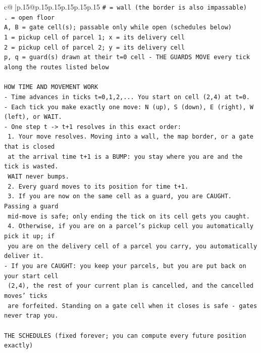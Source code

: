\documentclass{article}
\begin{document}
{\begin{supertabular}{c@{$\;$}|p{.15\linewidth}@{}p{.15\linewidth}p{.15\linewidth}p{.15\linewidth}p{.15\linewidth}p{.15\linewidth}}
{{{\texttt{\# = wall (the border is also impassable)} \\
\texttt{. = open floor} \\
\texttt{A, B = gate cell(s); passable only while open (schedules below)} \\
\texttt{1 = pickup cell of parcel 1; x = its delivery cell} \\
\texttt{2 = pickup cell of parcel 2; y = its delivery cell} \\
\texttt{p, q = guard(s) drawn at their t=0 cell {-} THE GUARDS MOVE every tick along the routes listed below} \\
\\ 
\texttt{HOW TIME AND MOVEMENT WORK} \\
\texttt{{-} Time advances in ticks t=0,1,2,... You start on cell (2,4) at t=0.} \\
\texttt{{-} Each tick you make exactly one move: N (up), S (down), E (right), W (left), or WAIT.} \\
\texttt{{-} One step t {-}> t+1 resolves in this exact order:} \\
\texttt{  1. Your move resolves. Moving into a wall, the map border, or a gate that is closed} \\
\texttt{     at the arrival time t+1 is a BUMP: you stay where you are and the tick is wasted.} \\
\texttt{     WAIT never bumps.} \\
\texttt{  2. Every guard moves to its position for time t+1.} \\
\texttt{  3. If you are now on the same cell as a guard, you are CAUGHT. Passing a guard} \\
\texttt{     mid{-}move is safe; only ending the tick on its cell gets you caught.} \\
\texttt{  4. Otherwise, if you are on a parcel's pickup cell you automatically pick it up; if} \\
\texttt{     you are on the delivery cell of a parcel you carry, you automatically deliver it.} \\
\texttt{{-} If you are CAUGHT: you keep your parcels, but you are put back on your start cell} \\
\texttt{  (2,4), the rest of your current plan is cancelled, and the cancelled moves' ticks} \\
\texttt{  are forfeited. Standing on a gate cell when it closes is safe {-} gates never trap you.} \\
\\ 
\texttt{THE SCHEDULES (fixed forever; you can compute every future position exactly)} \\
}}}
\end{supertabular}}
\end{document}
